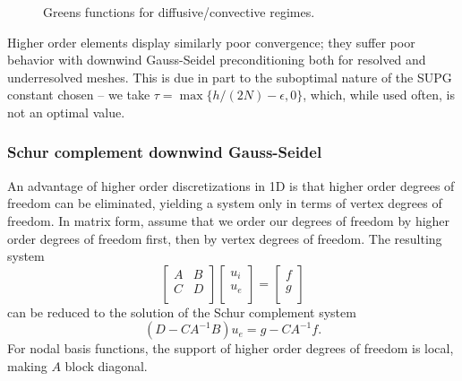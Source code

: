 \documentclass[final,leqno]{siamltex}
\def\arr#1#2#3#4{\left[
\begin{array}{cc}
#1 & #2\\
#3 & #4\\
\end{array}
\right]}
\def\vecttwo#1#2{\left[
\begin{array}{c}
#1\\
#2\\
\end{array}
\right]}
\begin{document}
\begin{figure}
\caption{Greens functions for diffusive/convective regimes.}
\label{fig:HO_GS}
\end{figure}

Higher order elements display similarly poor convergence; they suffer poor behavior with downwind Gauss-Seidel preconditioning both for resolved and underresolved meshes.  This is due in part to the suboptimal nature of the SUPG constant chosen -- we take $\tau = \max\{h/(2N)-\epsilon,0\}$, which, while used often, is not an optimal value.  

\subsubsection{Schur complement downwind Gauss-Seidel}

An advantage of higher order discretizations in 1D is that higher order degrees of freedom can be eliminated, yielding a system only in terms of vertex degrees of freedom.  In matrix form, assume that we order our degrees of freedom by higher order degrees of freedom first, then by vertex degrees of freedom.  The resulting system
\[
\arr{A}{B}{C}{D}\vecttwo{u_i}{u_e} = \vecttwo{f}{g}
\]
can be reduced to the solution of the Schur complement system
\[
(D-CA^{-1}B)u_e = g - CA^{-1}f.
\]
For nodal basis functions, the support of higher order degrees of freedom is local, making $A$ block diagonal.  
\end{document}
